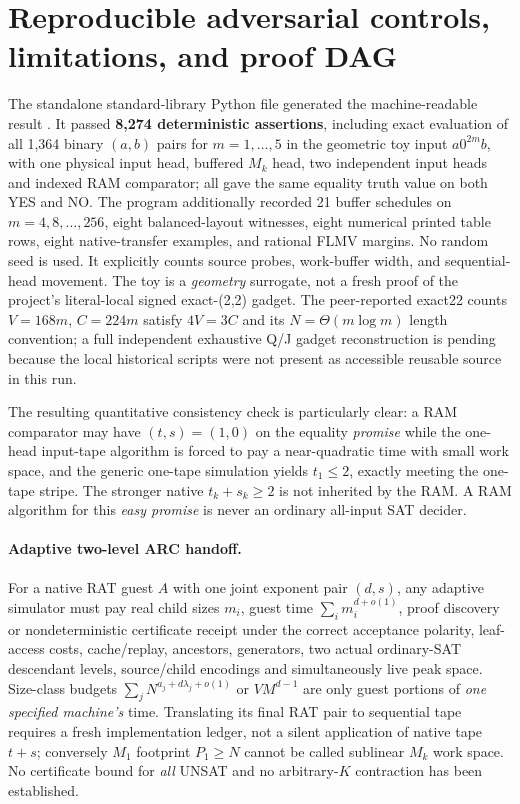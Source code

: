 \documentclass[11pt]{article}
\begin{document}
\section{Reproducible adversarial controls, limitations, and proof DAG}
The standalone standard-library Python file  generated the machine-readable result . It passed \textbf{8,274 deterministic assertions}, including exact evaluation of all 1,364 binary $(a,b)$ pairs for $m=1,\ldots,5$ in the geometric toy input $a0^{2m}b$, with one physical input head, buffered $M_k$ head, two independent input heads and indexed RAM comparator; all gave the same equality truth value on both YES and NO. The program additionally recorded 21 buffer schedules on $m=4,8,\ldots,256$, eight balanced-layout witnesses, eight numerical printed table rows, eight native-transfer examples, and rational FLMV margins. No random seed is used. It explicitly counts source probes, work-buffer width, and sequential-head movement. The toy is a \emph{geometry} surrogate, not a fresh proof of the project's literal-local signed exact-(2,2) gadget. The peer-reported exact22 counts $V=168m$, $C=224m$ satisfy $4V=3C$ and its $N=\Theta(m\log m)$ length convention; a full independent exhaustive Q/J gadget reconstruction is pending because the local historical scripts were not present as accessible reusable source in this run.

The resulting quantitative consistency check is particularly clear: a RAM comparator may have $(t,s)=(1,0)$ on the equality \emph{promise} while the one-head input-tape algorithm is forced to pay a near-quadratic time with small work space, and the generic one-tape simulation yields $t_1\le2$, exactly meeting the one-tape stripe. The stronger native $t_k+s_k\ge2$ is not inherited by the RAM. A RAM algorithm for this \emph{easy promise} is never an ordinary all-input SAT decider.

\paragraph{Adaptive two-level ARC handoff.} For a native RAT guest $A$ with one joint exponent pair $(d,s)$, any adaptive simulator must pay real child sizes $m_i$, guest time $\sum_i m_i^{d+o(1)}$, proof discovery or nondeterministic certificate receipt under the correct acceptance polarity, leaf-access costs, cache/replay, ancestors, generators, two actual ordinary-SAT descendant levels, source/child encodings and simultaneously live peak space. Size-class budgets $\sum_j N^{a_j+d\lambda_j+o(1)}$ or $V M^{d-1}$ are only guest portions of \emph{one specified machine's} time. Translating its final RAT pair to sequential tape requires a fresh implementation ledger, not a silent application of native tape $t+s$; conversely $M_1$ footprint $P_1\ge N$ cannot be called sublinear $M_k$ work space. No certificate bound for \emph{all} UNSAT and no arbitrary-$K$ contraction has been established.
\end{document}
